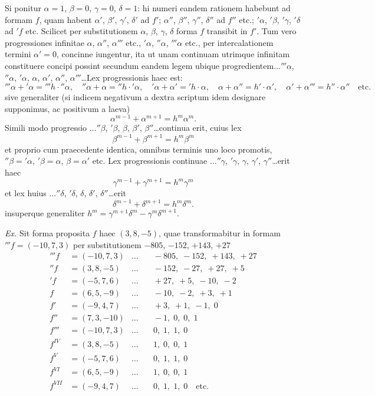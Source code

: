 \documentclass[12pt,a4paper]{article}
\theoremstyle{plain}
\begin{document}
Si ponitur $\alpha = 1$, $\beta = 0$, $\gamma = 0$, $\delta = 1$: hi numeri eandem rationem habebunt ad formam $f$, quam habent $\alpha'$, $\beta'$, $\gamma'$, $\delta'$ ad $f'$; $\alpha''$, $\beta''$, $\gamma''$, $\delta''$ ad $f''$ etc.; $'\alpha$, $'\beta$, $'\gamma$, $'\delta$ ad $'f$ etc. Scilicet per substitutionem $\alpha$, $\beta$, $\gamma$, $\delta$ forma $f$ transibit in $f'$. Tum vero progressiones infinitae $\alpha$, $\alpha''$, $\alpha'''$ etc., $'\alpha$, $''\alpha$, $'''\alpha$ etc., per intercalationem termini $\alpha' = 0$, concinne iungentur, ita ut unam continuam utrimque infinitam constituere concipi possint secundum eandem legem ubique progredientem$\ldots'''\alpha$, $''\alpha$, $'\alpha$, $\alpha$, $\alpha'$, $\alpha''$, $\alpha'''$\ldots Lex progressionis haec est:
\[
'''\alpha + '\alpha = '''h \cdot ''\alpha, \quad ''\alpha + \alpha = ''h \cdot '\alpha, \quad '\alpha + \alpha' = 'h \cdot \alpha, \quad \alpha + \alpha'' = h' \cdot \alpha', \quad \alpha' + \alpha''' = h'' \cdot \alpha'' \quad \text{etc.}
\]
sive generaliter (si indicem negativum a dextra scriptum idem designare supponimus, ac positivum a laeva)
\[
\alpha^{m-1} + \alpha^{m+1} = h^m \alpha^m.
\]
Simili modo progressio $\ldots''\beta$, $'\beta$, $\beta$, $\beta'$, $\beta''$\ldots continua erit, cuius lex
\[
\beta^{m-1} + \beta^{m+1} = h^m \beta^m
\]
et proprio cum praecedente identica, omnibus terminis uno loco promotis, $''\beta = '\alpha$, $'\beta = \alpha$, $\beta = \alpha'$ etc. Lex progressionis continuae $\ldots''\gamma$, $'\gamma$, $\gamma$, $\gamma'$, $\gamma''$\ldots erit haec
\[
\gamma^{m-1} + \gamma^{m+1} = h^m \gamma^m
\]
et lex huius $\ldots''\delta$, $'\delta$, $\delta$, $\delta'$, $\delta''$\ldots erit
\[
\delta^{m-1} + \delta^{m+1} = h^m \delta^m.
\]
insuperque generaliter $h^m = \gamma^{m+1} \delta^m - \gamma^m \delta^{m+1}$.

\textit{Ex.} Sit forma proposita $f$ haec $(3, 8, -5)$, quae transformabitur in formam $'''f = (-10, 7, 3)$ per substitutionem $-805$, $-152$, $+143$, $+27$
\[
\begin{aligned}
'''f &= (-10, 7, 3) & \ldots & \quad -805, \; -152, \; +143, \; +27\\
''f &= (3, 8, -5) & \ldots & \quad -152, \; -27, \; +27, \; +5\\
'f &= (-5, 7, 6) & \ldots & \quad +27, \; +5, \; -10, \; -2\\
f &= (6, 5, -9) & \ldots & \quad -10, \; -2, \; +3, \; +1\\
f' &= (-9, 4, 7) & \ldots & \quad +3, \; +1, \; -1, \; 0\\
f'' &= (7, 3, -10) & \ldots & \quad -1, \; 0, \; 0, \; 1\\
f''' &= (-10, 7, 3) & \ldots & \quad 0, \; 1, \; 1, \; 0\\
f^{IV} &= (3, 8, -5) & \ldots & \quad 1, \; 0, \; 0, \; 1\\
f^V &= (-5, 7, 6) & \ldots & \quad 0, \; 1, \; 1, \; 0\\
f^{VI} &= (6, 5, -9) & \ldots & \quad 1, \; 0, \; 0, \; 1\\
f^{VII} &= (-9, 4, 7) & \ldots & \quad 0, \; 1, \; 1, \; 0 \quad \text{etc.}
\end{aligned}
\]
\end{document}
